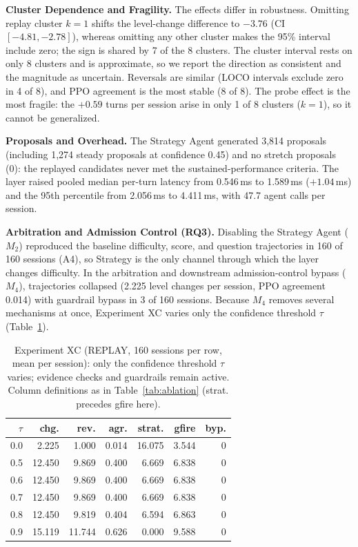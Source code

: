 \documentclass[runningheads,a4paper]{llncs}
\begin{document}
\textbf{Cluster Dependence and Fragility.} The effects differ in robustness. Omitting replay cluster $k=1$ shifts the level-change difference to $-3.76$ (CI $[-4.81,-2.78]$), whereas omitting any other cluster makes the 95\% interval include zero; the sign is shared by 7 of the 8 clusters. The cluster interval rests on only 8 clusters and is approximate, so we report the direction as consistent and the magnitude as uncertain. Reversals are similar (LOCO intervals exclude zero in 4 of 8), and PPO agreement is the most stable (8 of 8). The probe effect is the most fragile: the $+0.59$ turns per session arise in only 1 of 8 clusters ($k=1$), so it cannot be generalized.

\textbf{Proposals and Overhead.} The Strategy Agent generated 3,814 proposals (including 1,274 steady proposals at confidence 0.45) and no stretch proposals (0): the replayed candidates never met the sustained-performance criteria. The layer raised pooled median per-turn latency from 0.546\,ms to 1.589\,ms ($+1.04$\,ms) and the 95th percentile from 2.056\,ms to 4.411\,ms, with 47.7 agent calls per session.

\textbf{Arbitration and Admission Control (RQ3).} Disabling the Strategy Agent ($M_2$) reproduced the baseline difficulty, score, and question trajectories in 160 of 160 sessions (A4), so Strategy is the only channel through which the layer changes difficulty. In the arbitration and downstream admission-control bypass ($M_4$), trajectories collapsed (2.225 level changes per session, PPO agreement 0.014) with guardrail bypass in 3 of 160 sessions. Because $M_4$ removes several mechanisms at once, Experiment XC varies only the confidence threshold $\tau$ (Table~\ref{tab:xc}).

\begin{table}[!htbp]
\caption{Experiment XC (REPLAY, 160 sessions per row, mean per session): only the confidence threshold $\tau$ varies; evidence checks and guardrails remain active. Column definitions as in Table~\ref{tab:ablation} (strat. precedes gfire here).}
\label{tab:xc}
\centering\footnotesize
\begin{tabular}{@{}rrrrrrr@{}}
\toprule
$\tau$ & chg. & rev. & agr. & strat. & gfire & byp.\\
\midrule
0.0 & 2.225 & 1.000 & 0.014 & 16.075 & 3.544 & 0\\
0.5 & 12.450 & 9.869 & 0.400 & 6.669 & 6.838 & 0\\
0.6 & 12.450 & 9.869 & 0.400 & 6.669 & 6.838 & 0\\
0.7 & 12.450 & 9.869 & 0.400 & 6.669 & 6.838 & 0\\
0.8 & 12.450 & 9.819 & 0.404 & 6.594 & 6.863 & 0\\
0.9 & 15.119 & 11.744 & 0.626 & 0.000 & 9.588 & 0\\
\bottomrule
\end{tabular}
\end{table}
\end{document}
